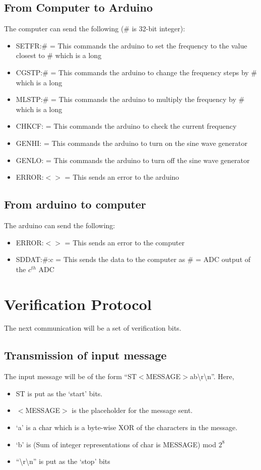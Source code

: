 \documentclass [a4paper,11pt]{article}
\begin{document}
\subsection{From Computer to Arduino}
The computer can send the following (\# is 32-bit integer):
\begin{itemize}
\item SETFR:\# = This commands the arduino to set the frequency to the value closest to \# which is a long
\item CGSTP:\# = This commands the arduino to change the frequency steps by \# which is a long
\item MLSTP:\# = This commands the arduino to multiply the frequency by \# which is a long
\item CHKCF: = This commands the arduino to check the current frequency
\item GENHI: = This commands the arduino to turn on the sine wave generator
\item GENLO: = This commands the arduino to turn off the sine wave generator
\item ERROR:$<>$ = This sends an error to the arduino
\end{itemize}
\subsection{From arduino to computer}
The arduino can send the following:
\begin{itemize}
\item ERROR:$<>$ = This sends an error to the computer
\item SDDAT:\#:c =  This sends the data to the computer as \# = ADC output of the $c^{th}$ ADC
\end{itemize}
\section{Verification Protocol}
The next communication will be a set of verification bits.
\subsection{Transmission of input message}
The input message will be of the form ``ST$<$MESSAGE$>$ab{\textbackslash}r{\textbackslash}n''. Here,
\begin{itemize}
\item ST is put as the `start' bits.
\item $<$MESSAGE$>$ is the placeholder for the message sent.
\item `a' is a char which is a byte-wise XOR of the characters in the message.
\item `b' is (Sum of integer representations of char is MESSAGE) mod $2^8$
\item ``{\textbackslash}r{\textbackslash}n'' is put as the `stop' bits
\end{itemize}
\end{document}
